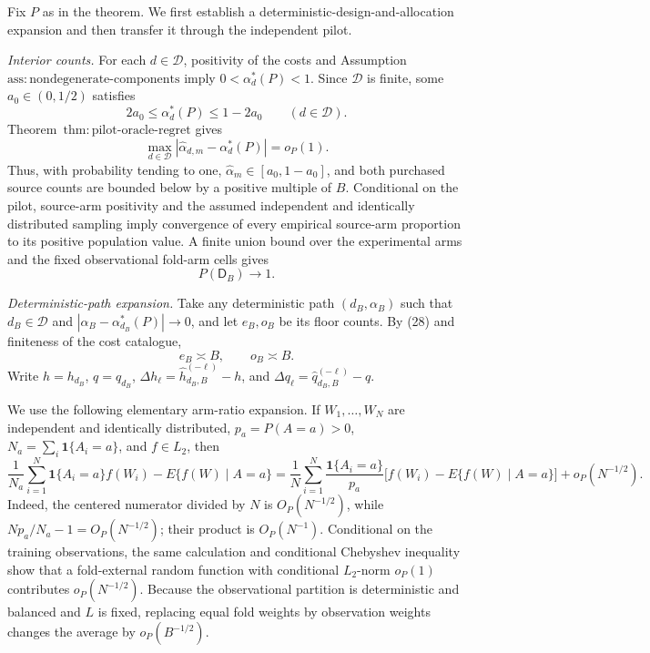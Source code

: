 Fix \(P\) as in the theorem.  We first establish a deterministic-design-and-allocation expansion and then transfer it through the independent pilot.

\emph{Interior counts.}  For each \(d\in\mathcal D\), positivity of the costs and Assumption~\(\mathrm{ass{:}nondegenerate\text{-}components}\) imply \(0<\alpha_d^*(P)<1\).  Since \(\mathcal D\) is finite, some \(a_0\in(0,1/2)\) satisfies
\[
 2a_0\le \alpha_d^*(P)\le1-2a_0
 \qquad(d\in\mathcal D).                                    \tag{28}
\]
Theorem~\(\mathrm{thm{:}pilot\text{-}oracle\text{-}regret}\) gives
\[
 \max_{d\in\mathcal D}|\widehat\alpha_{d,m}-\alpha_d^*(P)|=o_P(1). \tag{29}
\]
Thus, with probability tending to one, \(\widehat\alpha_m\in[a_0,1-a_0]\), and both purchased source counts are bounded below by a positive multiple of \(B\).  Conditional on the pilot, source-arm positivity and the assumed independent and identically distributed sampling imply convergence of every empirical source-arm proportion to its positive population value.  A finite union bound over the experimental arms and the fixed observational fold-arm cells gives
\[
 P(\mathsf D_B)\longrightarrow1.                              \tag{30}
\]

\emph{Deterministic-path expansion.}  Take any deterministic path \((d_B,\alpha_B)\) such that \(d_B\in\mathcal D\) and \(|\alpha_B-\alpha_{d_B}^*(P)|\to0\), and let \(e_B,o_B\) be its floor counts.  By (28) and finiteness of the cost catalogue,
\[
 e_B\asymp B,\qquad o_B\asymp B.                             \tag{31}
\]
Write \(h=h_{d_B}\), \(q=q_{d_B}\), \(\Delta h_\ell=\widehat h_{d_B,B}^{(-\ell)}-h\), and \(\Delta q_\ell=\widehat q_{d_B,B}^{(-\ell)}-q\).

We use the following elementary arm-ratio expansion.  If \(W_1,\ldots,W_N\) are independent and identically distributed, \(p_a=P(A=a)>0\), \(N_a=\sum_i\mathbf1\{A_i=a\}\), and \(f\in L_2\), then
\[
 \frac1{N_a}\sum_{i=1}^N\mathbf1\{A_i=a\}f(W_i)
 -E\{f(W)\mid A=a\}
 =\frac1N\sum_{i=1}^N\frac{\mathbf1\{A_i=a\}}{p_a}
 \bigl[f(W_i)-E\{f(W)\mid A=a\}\bigr]+o_P(N^{-1/2}).       \tag{32}
\]
Indeed, the centered numerator divided by \(N\) is \(O_P(N^{-1/2})\), while \(Np_a/N_a-1=O_P(N^{-1/2})\); their product is \(O_P(N^{-1})\).  Conditional on the training observations, the same calculation and conditional Chebyshev inequality show that a fold-external random function with conditional \(L_2\)-norm \(o_P(1)\) contributes \(o_P(N^{-1/2})\).  Because the observational partition is deterministic and balanced and \(L\) is fixed, replacing equal fold weights by observation weights changes the average by \(o_P(B^{-1/2})\).

